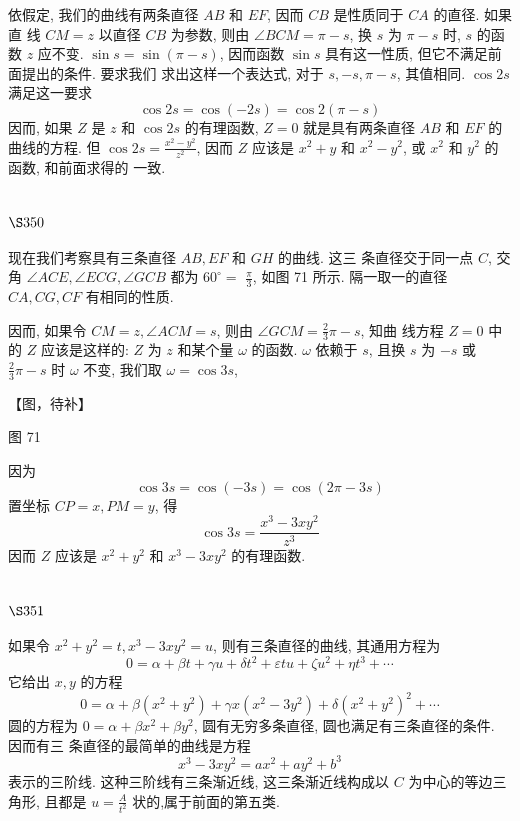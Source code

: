 依假定, 我们的曲线有两条直径 $A B$ 和 $E F$, 因而 $C B$ 是性质同于 $C A$ 的直径. 如果直 线 $C M=z$ 以直径 $C B$ 为参数, 则由 $\angle B C M=\pi-s$, 换 $s$ 为 $\pi-s$ 时, $s$ 的函数 $z$ 应不变. $\sin s=\sin (\pi-s)$, 因而函数 $\sin s$ 具有这一性质, 但它不满足前面提出的条件. 要求我们 求出这样一个表达式, 对于 $s,-s, \pi-s$, 其值相同. $\cos 2 s$ 满足这一要求
\[
\cos 2 s=\cos (-2 s)=\cos 2(\pi-s)
\]
因而, 如果 $Z$ 是 $z$ 和 $\cos 2 s$ 的有理函数, $Z=0$ 就是具有两条直径 $A B$ 和 $E F$ 的曲线的方程. 但 $\cos 2 s=\frac{x^{2}-y^{2}}{z^{2}}$, 因而 $Z$ 应该是 $x^{2}+y$ 和 $x^{2}-y^{2}$, 或 $x^{2}$ 和 $y^{2}$ 的函数, 和前面求得的 一致.

\section{$\S 350$}

现在我们考察具有三条直径 $A B, E F$ 和 $G H$ 的曲线. 这三 条直径交于同一点 $C$, 交角 $\angle A C E, \angle E C G, \angle G C B$ 都为 $60^{\circ}=$ $\frac{\pi}{3}$, 如图 71 所示. 隔一取一的直径 $C A, C G, C F$ 有相同的性质.

因而, 如果令 $C M=z, \angle A C M=s$, 则由 $\angle G C M=\frac{2}{3} \pi-s$, 知曲 线方程 $Z=0$ 中的 $Z$ 应该是这样的: $Z$ 为 $z$ 和某个量 $\omega$ 的函数. $\omega$ 依赖于 $s$, 且换 $s$ 为 $-s$ 或 $\frac{2}{3} \pi-s$ 时 $\omega$ 不变, 我们取 $\omega=\cos 3 s$,


【图，待补】

图 71 

因为
\[
\cos 3 s=\cos (-3 s)=\cos (2 \pi-3 s)
\]
置坐标 $C P=x, P M=y$, 得
\[
\cos 3 s=\frac{x^{3}-3 x y^{2}}{z^{3}}
\]
因而 $Z$ 应该是 $x^{2}+y^{2}$ 和 $x^{3}-3 x y^{2}$ 的有理函数.

\section{$\S 351$}

如果令 $x^{2}+y^{2}=t, x^{3}-3 x y^{2}=u$, 则有三条直径的曲线, 其通用方程为
\[
0=\alpha+\beta t+\gamma u+\delta t^{2}+\varepsilon t u+\zeta u^{2}+\eta t^{3}+\cdots
\]
它给出 $x, y$ 的方程
\[
0=\alpha+\beta\left(x^{2}+y^{2}\right)+\gamma x\left(x^{2}-3 y^{2}\right)+\delta\left(x^{2}+y^{2}\right)^{2}+\cdots
\]
圆的方程为 $0=\alpha+\beta x^{2}+\beta y^{2}$, 圆有无穷多条直径, 圆也满足有三条直径的条件. 因而有三 条直径的最简单的曲线是方程
\[
x^{3}-3 x y^{2}=a x^{2}+a y^{2}+b^{3}
\]
表示的三阶线. 这种三阶线有三条渐近线, 这三条渐近线构成以 $C$ 为中心的等边三角形, 且都是 $u=\frac{A}{t^{2}}$ 状的,属于前面的第五类.

